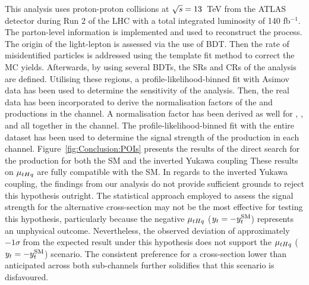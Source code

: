 This analysis uses proton-proton collisions at $\sqrt{s}=13$~TeV from the ATLAS detector during Run 2 of the LHC with a total integrated luminosity of 140 fb$^{-1}$. The parton-level information is implemented and used to reconstruct the \tHq process. The origin of the light-lepton is assessed via the use of BDT. 
Then the rate of misidentified particles is addressed using the template fit method to correct the MC yields. 
Afterwards, by using several BDTs, the SRs and CRs of the analysis are defined.
Utilising these regions, a profile-likelihood-binned fit with Asimov data has been used to determine the sensitivity of the analysis. Then, the real data has been incorporated to derive the normalisation factors of the \ttbar and \Zjets productions in the \dilepOStau channel.
A normalisation factor has been derived as well for \ttbar, \ttW, \ttH and \ttZ all together in the \dilepSStau channel. The profile-likelihood-binned fit with the entire dataset has been used to determine the signal strength of the \tHq production in each channel. Figure~\ref{fig:Conclusion:POIs} presents the results of the direct search for the \tHq production for both the SM and the inverted Yukawa coupling
These results on $\mu_{tHq}$ are fully compatible with the SM. 
In regards to the inverted Yukawa coupling, the findings from our analysis do not provide sufficient grounds to reject this hypothesis outright. The statistical approach employed to assess the signal strength for the alternative cross-section may not be the most effective for testing this hypothesis, particularly because the negative $\mu_{tHq}$ ($y_{t} = -y_{t}^{\text{SM}}$) represents an unphysical outcome. Nevertheless, the observed deviation of approximately $-1\sigma$ from the expected result under this hypothesis does not support the $\mu_{tHq}$ ($y_{t} = -y_{t}^{\text{SM}}$) scenario. The consistent preference for a cross-section lower than anticipated across both sub-channels further solidifies that this scenario is disfavoured.


